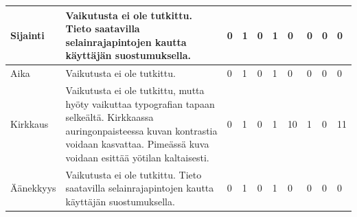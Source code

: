 \documentclass[finnish, 12pt, a4paper, elec, utf8, a-1b]{aaltothesis}
\begin{document}
{\begin{longtable}{p{2.5cm}|p{6cm}|p{0.5cm}p{0.5cm}p{0.5cm}|p{0.5cm}|p{0.5cm}p{0.5cm}p{0.5cm}|p{0.5cm}|}
    \midrule
    Sijainti                               & Vaikutusta ei ole tutkittu. Tieto saatavilla selainrajapintojen kautta käyttäjän suostumuksella.                                                                                                                                                                                                                                                                      & 0                                          & 1                                   & 0                                      & 1                            & 0                                               & 0                                         & 0                                         & 0                            \\
    \midrule
    Aika                                   & Vaikutusta ei ole tutkittu.                                                                                                                                                                                                                                                                                                                                           & 0                                          & 1                                   & 0                                      & 1                            & 0                                               & 0                                         & 0                                         & 0                            \\
    \midrule
    Kirkkaus                               & Vaikutusta ei ole tutkittu, mutta hyöty vaikuttaa typografian tapaan selkeältä. Kirkkaassa auringonpaisteessa kuvan kontrastia voidaan kasvattaa. Pimeässä kuva voidaan esittää yötilan kaltaisesti.                                                                                                                                                                  & 0                                          & 1                                   & 0                                      & 1                            & 10                                              & 1                                         & 0                                         & 11                           \\
    \midrule
    Äänekkyys                              & Vaikutusta ei ole tutkittu. Tieto saatavilla selainrajapintojen kautta käyttäjän suostumuksella.                                                                                                                                                                                                                                                                      & 0                                          & 1                                   & 0                                      & 1                            & 0                                               & 0                                         & 0                                         & 0                            \\

\end{longtable}}
\end{document}
